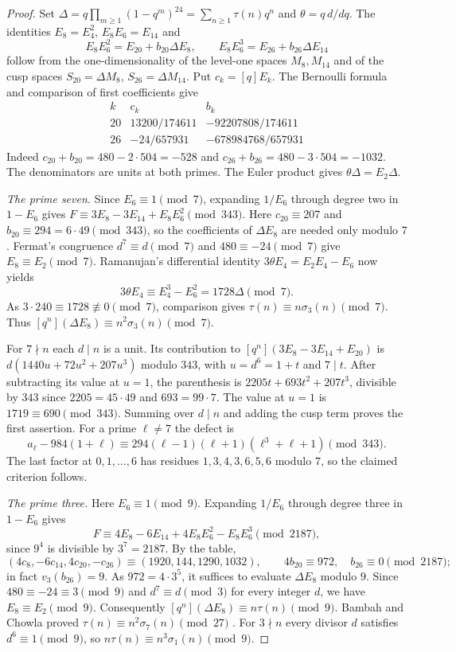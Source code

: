 \begin{proof}
Set $\Delta=q\prod_{m\ge1}(1-q^m)^{24}=\sum_{n\ge1}\tau(n)q^n$ and $\theta=q\,d/dq$. The
identities $E_8=E_4^2$, $E_8E_6=E_{14}$ and
\[
 E_8E_6^2=E_{20}+b_{20}\Delta E_8,\qquad
 E_8E_6^3=E_{26}+b_{26}\Delta E_{14}
\]
follow from the one-dimensionality of the level-one spaces $M_8,M_{14}$ and of the cusp
spaces $S_{20}=\Delta M_8$, $S_{26}=\Delta M_{14}$. Put $c_k=[q]E_k$. The Bernoulli
formula and comparison of first coefficients give
\[
 \begin{array}{c|rr}
 k&c_k&b_k\\ \hline
 20&13200/174611&-92207808/174611\\
 26&-24/657931&-678984768/657931
 \end{array}
\]
Indeed $c_{20}+b_{20}=480-2\cdot504=-528$ and $c_{26}+b_{26}=480-3\cdot504=-1032$. The
denominators are units at both primes. The Euler product gives $\theta\Delta=E_2\Delta$.

\emph{The prime seven.} Since $E_6\equiv1\pmod7$, expanding $1/E_6$ through degree two in
$1-E_6$ gives $F\equiv3E_8-3E_{14}+E_8E_6^2\pmod{343}$. Here $c_{20}\equiv207$ and
$b_{20}\equiv294=6\cdot49\pmod{343}$, so the coefficients of $\Delta E_8$ are needed only
modulo $7$. Fermat's congruence $d^7\equiv d\pmod7$ and $480\equiv-24\pmod7$ give
$E_8\equiv E_2\pmod7$. Ramanujan's differential identity $3\theta E_4=E_2E_4-E_6$ now
yields
\[
 3\theta E_4\equiv E_4^3-E_6^2=1728\Delta\pmod7 .
\]
As $3\cdot240\equiv1728\not\equiv0\pmod7$, comparison gives
$\tau(n)\equiv n\sigma_3(n)\pmod7$. Thus $[q^n](\Delta E_8)\equiv n^2\sigma_3(n)\pmod7$.

For $7\nmid n$ each $d\mid n$ is a unit. Its contribution to $[q^n](3E_8-3E_{14}+E_{20})$
is $d(1440u+72u^2+207u^3)$ modulo $343$, with $u=d^6=1+t$ and $7\mid t$. After subtracting
its value at $u=1$, the parenthesis is $2205t+693t^2+207t^3$, divisible by $343$ since
$2205=45\cdot49$ and $693=99\cdot7$. The value at $u=1$ is $1719\equiv690\pmod{343}$.
Summing over $d\mid n$ and adding the cusp term proves the first assertion. For a prime
$\ell\ne7$ the defect is
\[
 a_\ell-984(1+\ell)\equiv294(\ell-1)(\ell+1)(\ell^3+\ell+1)\pmod{343}.
\]
The last factor at $0,1,\dots,6$ has residues $1,3,4,3,6,5,6$ modulo $7$, so the claimed
criterion follows.

\emph{The prime three.} Here $E_6\equiv1\pmod9$. Expanding $1/E_6$ through degree three in
$1-E_6$ gives
\[
 F\equiv4E_8-6E_{14}+4E_8E_6^2-E_8E_6^3\pmod{2187},
\]
since $9^4$ is divisible by $3^7=2187$. By the table,
\[
 (4c_8,-6c_{14},4c_{20},-c_{26})\equiv(1920,144,1290,1032),\qquad
 4b_{20}\equiv972,\quad b_{26}\equiv0\pmod{2187};
\]
in fact $v_3(b_{26})=9$. As $972=4\cdot3^5$, it suffices to evaluate $\Delta E_8$ modulo
$9$. Since $480\equiv-24\equiv3\pmod9$ and $d^7\equiv d\pmod3$ for every integer $d$, we
have $E_8\equiv E_2\pmod9$. Consequently $[q^n](\Delta E_8)\equiv n\tau(n)\pmod9$. Bambah
and Chowla proved $\tau(n)\equiv n^2\sigma_7(n)\pmod{27}$
\cite[eq.~(16)]{Bambah1947Congruence}. For $3\nmid n$ every divisor $d$ satisfies
$d^6\equiv1\pmod9$, so $n\tau(n)\equiv n^3\sigma_1(n)\pmod9$.


\end{proof}
